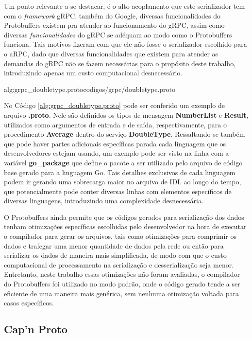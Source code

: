 Um ponto relevante a se destacar, é o alto acoplamento que este serializador tem com o \textit{framework} gRPC, também do Google, diversas funcionalidades do Protobuffers existem pra atender ao funcionamento do gRPC, assim como diversas \textit{funcionalidades} do gRPC se adéquam ao modo como o Protobuffers funciona. Tais motivos fizeram com que ele não fosse o serializador escolhido para o aRPC, dado que diversas funcionalidades que existem para atender as demandas do gRPC não se fazem necessárias para o propósito deste trabalho, introduzindo apenas um custo computacional desnecessário.

 {alg:grpc_doubletype.proto}{codigos/grpc/doubletype.proto}{}

No Código \ref{alg:grpc_doubletype.proto} pode ser conferido um exemplo de arquivo \textbf{.proto}. Nele são definidos os tipos de mensagem \textbf{NumberList} e \textbf{Result}, utilizados como argumentos de entrada e de saída, respectivamente, para o procedimento \textbf{Average} dentro do serviço \textbf{DoubleType}. Ressaltando-se também que pode haver partes adicionais específicas parada cada linguagem que os desenvolvedores estejam usando, um exemplo pode ser visto na linha com a variável \textbf{go\_package} que define o pacote a ser utilizado pelo arquivo de código base gerado para a linguagem Go. Tais detalhes exclusivos de cada linguagem podem ir gerando uma sobrecarga maior no arquivo de IDL ao longo do tempo, que potencialmente pode conter diversas linhas com elementos específicos de diversas linguagens, introduzindo uma complexidade desnecessária.

O Protobuffers ainda permite que os códigos gerados para serialização dos dados tenham otimizações específicas escolhidas pelo desenvolvedor na hora de executar o compilador para gerar os arquivos, tais como otimizações para comprimir os dados e trafegar uma menor quantidade de dados pela rede ou então para serializar os dados de maneira mais simplificada, de modo com que o custo computacional de processamento na serialização e desserialização seja menor. Entretanto, neste trabalho essas otimizações não foram avaliadas, o compilador do Protobuffers foi utilizado no modo padrão, onde o código gerado tende a ser eficiente de uma maneira mais genérica, sem nenhuma otimização voltada para casos específicos.

\subsection{Cap'n Proto}

